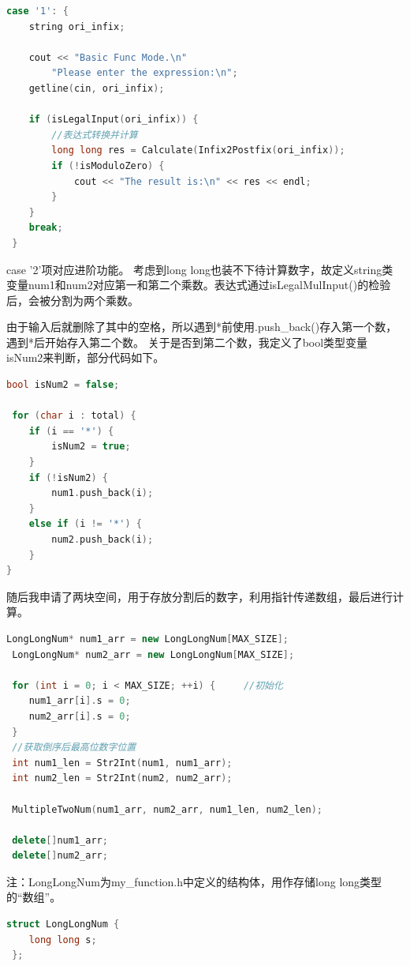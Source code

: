 \documentclass[a4paper, 11pt, UTF8]{ctexart}
\begin{document}
\begin{lstlisting}[language=C++, basicstyle=\ttfamily]
 case '1': {
    string ori_infix;

    cout << "Basic Func Mode.\n"
        "Please enter the expression:\n";
    getline(cin, ori_infix);

    if (isLegalInput(ori_infix)) {
        //表达式转换并计算
        long long res = Calculate(Infix2Postfix(ori_infix));
        if (!isModuloZero) {
            cout << "The result is:\n" << res << endl;
        }
    }
    break;
 }   
\end{lstlisting}

case '2'项对应进阶功能。
考虑到long long也装不下待计算数字，故定义string类变量num1和num2对应第一和第二个乘数。表达式通过isLegalMulInput()的检验后，会被分割为两个乘数。

由于输入后就删除了其中的空格，所以遇到*前使用.push\_back()存入第一个数，遇到*后开始存入第二个数。
关于是否到第二个数，我定义了bool类型变量isNum2来判断，部分代码如下。

\begin{lstlisting}[language=C++, basicstyle=\ttfamily]
 bool isNum2 = false;

 for (char i : total) {
    if (i == '*') {
        isNum2 = true;
    }
    if (!isNum2) {
        num1.push_back(i);
    }
    else if (i != '*') {
        num2.push_back(i);
    }
}
\end{lstlisting}

随后我申请了两块空间，用于存放分割后的数字，利用指针传递数组，最后进行计算。

\begin{lstlisting}[language=C++, basicstyle=\ttfamily]
 LongLongNum* num1_arr = new LongLongNum[MAX_SIZE];
 LongLongNum* num2_arr = new LongLongNum[MAX_SIZE];

 for (int i = 0; i < MAX_SIZE; ++i) {     //初始化
    num1_arr[i].s = 0;
    num2_arr[i].s = 0;
 }
 //获取倒序后最高位数字位置
 int num1_len = Str2Int(num1, num1_arr); 
 int num2_len = Str2Int(num2, num2_arr);

 MultipleTwoNum(num1_arr, num2_arr, num1_len, num2_len);

 delete[]num1_arr;
 delete[]num2_arr;
\end{lstlisting}

注：LongLongNum为my\_function.h中定义的结构体，用作存储long long类型的“数组”。

\begin{lstlisting}[language=C++, basicstyle=\ttfamily]
 struct LongLongNum { 
    long long s;
 };
\end{lstlisting}
\end{document}
